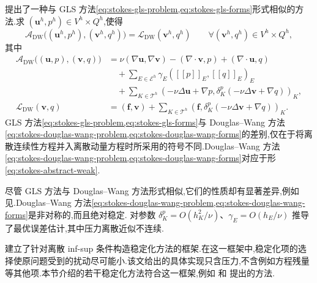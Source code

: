 \begin{note}\label{note:stokes-douglas-wang-method}
\textcite{DouglasWang1989} 提出了一种与 GLS 方法\cref{eq:stokes-gls-problem,eq:stokes-gls-forms}形式相似的方法.求 $(\bm{u}^h,p^h)\in V^h\times Q^h$,使得
\begin{equation}\label{eq:stokes-douglas-wang-problem}
 \mathcal{A}_{\mathrm{DW}}\bigl((\bm{u}^h,p^h),
                  (\bm{v}^h,q^h)\bigr)
 =\mathcal{L}_{\mathrm{DW}}(\bm{v}^h,q^h)
 \qquad\forall(\bm{v}^h,q^h)\in V^h\times Q^h,
\end{equation}
其中
\begin{equation}\label{eq:stokes-douglas-wang-forms}
\begin{aligned}
 \mathcal{A}_{\mathrm{DW}}\bigl((\bm{u},p),(\bm{v},q)\bigr)
 &=\nu(\nabla\bm{u},\nabla\bm{v})
   -(\nabla\cdot\bm{v},p)+(\nabla\cdot\bm{u},q)\\
 &\quad+\sum_{E\in\mathcal{E}^h}
       \gamma_E([[p]]_E,[[q]]_E)_E\\
 &\quad+\sum_{K\in\mathcal{T}^h}
       (-\nu\Delta\bm{u}+\nabla p,
         \delta_K^p(-\nu\Delta\bm{v}+\nabla q))_K,\\
 \mathcal{L}_{\mathrm{DW}}(\bm{v},q)
 &=(\bm{f},\bm{v})
   +\sum_{K\in\mathcal{T}^h}
       (\bm{f},\delta_K^p(-\nu\Delta\bm{v}+\nabla q))_K.
\end{aligned}
\end{equation}
GLS 方法\cref{eq:stokes-gls-problem,eq:stokes-gls-forms}与 Douglas--Wang 方法\cref{eq:stokes-douglas-wang-problem,eq:stokes-douglas-wang-forms}的差别,仅在于将离散连续性方程并入离散动量方程时所采用的符号不同.Douglas--Wang 方法\cref{eq:stokes-douglas-wang-problem,eq:stokes-douglas-wang-forms}对应于形\cref{eq:stokes-abstract-weak}.

尽管 GLS 方法与 Douglas--Wang 方法形式相似,它们的性质却有显著差异,例如见\parencite{FrancaHughesStenberg1993,BarthBochevGunzburgerShadid2004}.Douglas--Wang 方法\cref{eq:stokes-douglas-wang-problem,eq:stokes-douglas-wang-forms}是非对称的,而且绝对稳定.\textcite{DouglasWang1989} 对参数 $\delta_K^p=O(h_K^2/\nu)$、$\gamma_E=O(h_E/\nu)$ 推导了最优误差估计,其中压力离散近似不连续.
\end{note}

\begin{note}[仅含压力的稳定化框架]\label{note:stokes-pressure-only-stabilization-framework}
\textcite{BrezziFortin2001}建立了针对离散 inf-sup 条件构造稳定化方法的框架.在这一框架中,稳定化项的选择使原问题受到的扰动尽可能小.该文给出的具体实现只含压力,不含例如方程残量等其他项.本节介绍的若干稳定化方法符合这一框架,例如 \textcite{BrezziPitkaranta1984} 和 \textcite{CodinaBlasco1997} 提出的方法.
\end{note}

